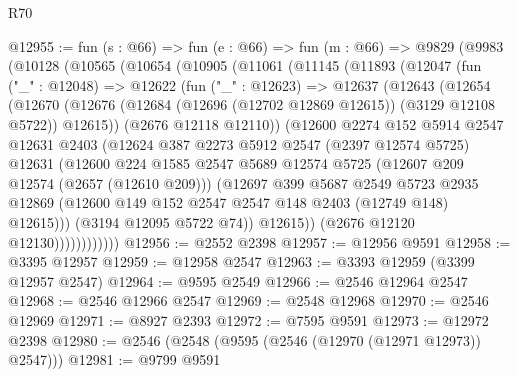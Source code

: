\begin{lexlean}{R70}
\begin{coremodule}
@12955 := fun (s : @66) =>
  fun (e : @66) =>
  fun (m : @66) =>
  @9829
    (@9983
      (@10128
        (@10565
          (@10654
            (@10905
              (@11061
                (@11145
                  (@11893
                    (@12047
                      (fun ("_" : @12048) =>
                      @12622
                        (fun ("_" : @12623) =>
                        @12637
                          (@12643
                            (@12654
                              (@12670
                                (@12676
                                  (@12684 (@12696 (@12702 @12869 @12615)) (@3129 @12108 @5722))
                                  @12615))
                              (@2676 @12118 @12110))
                            (@12600
                              @2274
                              @152
                              @5914
                              @2547
                              @12631
                              @2403
                              (@12624
                                @387
                                @2273
                                @5912
                                @2547
                                (@2397 @12574 @5725)
                                @12631
                                (@12600
                                  @224
                                  @1585
                                  @2547
                                  @5689
                                  @12574
                                  @5725
                                  (@12607 @209 @12574 (@2657 (@12610 @209)))
                                  (@12697
                                    @399
                                    @5687
                                    @2549
                                    @5723
                                    @2935
                                    @12869
                                    (@12600 @149 @152 @2547 @2547 @148 @2403 (@12749 @148) @12615)))
                                (@3194 @12095 @5722 @74))
                              @12615))
                          (@2676 @12120 @12130))))))))))))
@12956 := @2552 @2398
@12957 := @12956 @9591
@12958 := @3395 @12957
@12959 := @12958 @2547
@12963 := @3393 @12959 (@3399 @12957 @2547)
@12964 := @9595 @2549
@12966 := @2546 @12964 @2547
@12968 := @2546 @12966 @2547
@12969 := @2548 @12968
@12970 := @2546 @12969
@12971 := @8927 @2393
@12972 := @7595 @9591
@12973 := @12972 @2398
@12980 := @2546 (@2548 (@9595 (@2546 (@12970 (@12971 @12973)) @2547)))
@12981 := @9799 @9591

\end{coremodule}
\end{lexlean}
